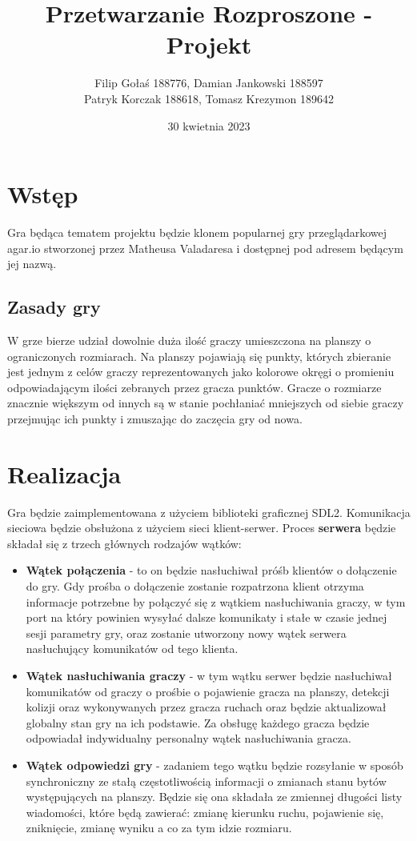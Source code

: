 \documentclass{article}
\title{Przetwarzanie Rozproszone - Projekt}
\author{Filip Gołaś 188776, Damian Jankowski 188597\\Patryk Korczak 188618, Tomasz Krezymon 189642}
\date{30 kwietnia 2023}
\begin{document}
\maketitle

\section{Wstęp}
Gra będąca tematem projektu będzie klonem popularnej gry przeglądarkowej agar.io stworzonej przez Matheusa Valadaresa i dostępnej pod adresem będącym jej nazwą.

\subsection{Zasady gry}
W grze bierze udział dowolnie duża ilość graczy umieszczona na planszy o ograniczonych rozmiarach. Na planszy
pojawiają się punkty, których zbieranie jest jednym z celów graczy reprezentowanych jako kolorowe okręgi o promieniu
odpowiadającym ilości zebranych przez gracza punktów. Gracze o rozmiarze znacznie większym od innych są w stanie
pochłaniać mniejszych od siebie graczy przejmując ich punkty i zmuszając do zaczęcia gry od nowa.

\section{Realizacja}
Gra będzie zaimplementowana z użyciem biblioteki graficznej SDL2. Komunikacja sieciowa będzie obsłużona z użyciem sieci klient-serwer.
Proces \textbf{serwera} będzie składał się z trzech głównych rodzajów wątków:
\begin{itemize}
    \item  \textbf{Wątek połączenia} - to on będzie nasłuchiwał próśb klientów o dołączenie do gry. Gdy prośba o dołączenie
    zostanie rozpatrzona klient otrzyma informacje potrzebne by połączyć się z wątkiem nasłuchiwania graczy, w
    tym port na który powinien wysyłać dalsze komunikaty i stałe w czasie jednej sesji parametry gry, oraz zostanie utworzony nowy wątek serwera nasłuchujący komunikatów od tego klienta.
    \item  \textbf{Wątek nasłuchiwania graczy} - w tym wątku serwer będzie nasłuchiwał komunikatów od graczy o prośbie o
    pojawienie gracza na planszy, detekcji kolizji oraz wykonywanych przez gracza ruchach oraz będzie aktualizował
    globalny stan gry na ich podstawie. Za obsługę każdego gracza będzie odpowiadał indywidualny personalny wątek nasłuchiwania gracza.    
    \item \textbf{Wątek odpowiedzi gry} - zadaniem tego wątku będzie rozsyłanie w sposób synchroniczny ze stałą częstotliwością informacji o zmianach stanu bytów występujących na planszy. Będzie się ona składała ze zmiennej długości listy wiadomości, które będą zawierać: zmianę kierunku ruchu, pojawienie się, zniknięcie, zmianę wyniku a co za tym idzie rozmiaru.
\end{itemize}
\end{document}
